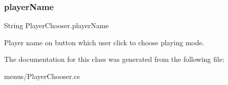 \subsubsection{\texorpdfstring{player\+Name}{playerName}}
{\footnotesize\ttfamily String Player\+Chooser.\+player\+Name\hspace{0.3cm}{\ttfamily [private]}}



Player name on button which user click to choose playing mode. 



The documentation for this class was generated from the following file\+:\begin{DoxyCompactItemize}
\item 
menus/Player\+Chooser.\+cs\end{DoxyCompactItemize}
